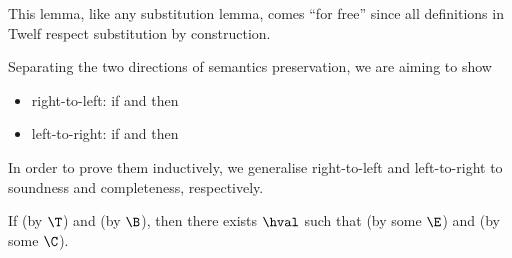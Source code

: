 \Twelf
This lemma, like any substitution lemma, comes ``for free'' since all definitions in Twelf respect substitution by construction.

\vspace{0.5cm}

\noindent Separating the two directions of semantics preservation, we are aiming to show
\begin{itemize}
  \item[]right-to-left: if \trahb{\benv}{\envnil}{\bexp}{\hexp} and \bev{\envnil}{\bexp}{\n{\nat}} then \hev{\hexp}{\n{\nat}}
  \item[]left-to-right: if \trahb{\benv}{\envnil}{\bexp}{\hexp} and \hev{\hexp}{\n{\nat}} then \bev{\envnil}{\bexp}{\n{\nat}}
\end{itemize}
In order to prove them inductively, we generalise right-to-left and left-to-right to soundness and completeness, respectively.

\begin{lemma}[Soundness]
\label{lem:soundness-hb}
If \trahb{\benv}{\envnil}{\hexp}{\bexp} (by $\T$) and \bev{\benv}{\bexp}{\bval} (by $\B$), then there exists $\hval$ such that \hev{\hexp}{\hval} (by some $\E$) and \corhb{\benv}{\bval}{\hval} (by some $\C$).
\end{lemma}



